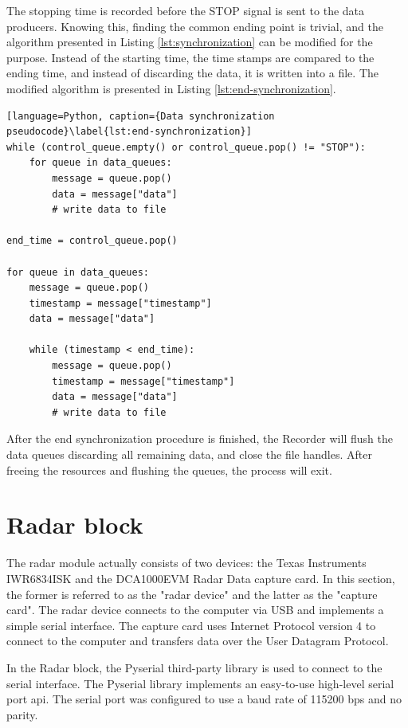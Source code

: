 The stopping time is recorded before the STOP signal is sent to the data producers.
Knowing this, finding the common ending point is trivial,
and the algorithm presented in Listing \ref{lst:synchronization} can be modified for the purpose.
Instead of the starting time, the time stamps are compared to the ending time,
and instead of discarding the data, it is written into a file.
The modified algorithm is presented in Listing \ref{lst:end-synchronization}.

\begin{lstlisting}[language=Python, caption={Data synchronization pseudocode}\label{lst:end-synchronization}]
while (control_queue.empty() or control_queue.pop() != "STOP"):
    for queue in data_queues:
        message = queue.pop()
        data = message["data"]
        # write data to file
        
end_time = control_queue.pop()

for queue in data_queues:
    message = queue.pop()
    timestamp = message["timestamp"]
    data = message["data"]
    
    while (timestamp < end_time):
        message = queue.pop()
        timestamp = message["timestamp"]
        data = message["data"]
        # write data to file
\end{lstlisting}

After the end synchronization procedure is finished,
the Recorder will flush the data queues discarding all remaining data,
and close the file handles.
After freeing the resources and flushing the queues, the process will exit.

\section{Radar block}
\label{sec:3-radar}
The radar module actually consists of two devices: the Texas Instruments IWR6834ISK and the DCA1000EVM Radar Data capture card.
In this section, the former is referred to as the "radar device" and the latter as the "capture card".
The radar device connects to the computer via USB and implements a simple serial interface.
The capture card uses Internet Protocol version 4 to connect to the computer and transfers data over the User Datagram Protocol.

In the Radar block, the Pyserial third-party library is used to connect to the serial interface.
The Pyserial library implements an easy-to-use high-level serial port \gls{api}. \cite{python-serial}
The serial port was configured to use a baud rate of 115200 bps and no parity.

